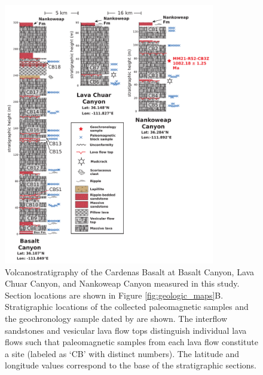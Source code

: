 \begin{figure}[h!]
\centering
\includegraphics[width=0.82\textwidth]{figure/Zhang2024b/Cardenas_strat_uniform_scale.pdf}
\caption[Volcanostratigraphy of the Cardenas Basalt at Basalt Canyon, Lava Chuar Canyon, and Nankoweap Canyon]{Volcanostratigraphy of the Cardenas Basalt at Basalt Canyon, Lava Chuar Canyon, and Nankoweap Canyon measured in this study. Section locations are shown in Figure \ref{fig:geologic_maps}B. Stratigraphic locations of the collected paleomagnetic samples and the geochronology sample dated by \cite{Mohr2024a} are shown. The interflow sandstones and vesicular lava flow tops distinguish individual lava flows such that paleomagnetic samples from each lava flow constitute a site (labeled as `CB' with distinct numbers). The latitude and longitude values correspond to the base of the stratigraphic sections.}
\label{fig:cardenas_strat}
\end{figure}

